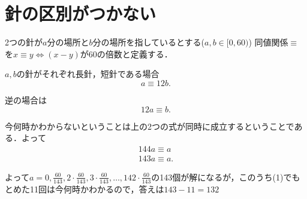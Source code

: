 \section{針の区別がつかない}
2つの針が$a$分の場所と$b$分の場所を指しているとする($a, b \in [0, 60)$)
同値関係$\equiv$を$x \equiv y \Leftrightarrow (x - y) \mathrm{が60の倍数}$と定義する．

$a,b$の針がそれぞれ長針，短針である場合
\[
a \equiv 12b.
\]

逆の場合は
\[
12a \equiv b.
\]

今何時かわからないということは上の2つの式が同時に成立するということである．よって
\begin{align*}
  144a \equiv a\\
  143a \equiv a.
\end{align*}

よって$a = 0, \frac{60}{143}, 2\cdot\frac{60}{143}, 3\cdot\frac{60}{143}, \dots, 142\cdot\frac{60}{143}$の143個が解になるが，このうち(1)でもとめた11回は今何時かわかるので，答えは$143 - 11 = 132$

